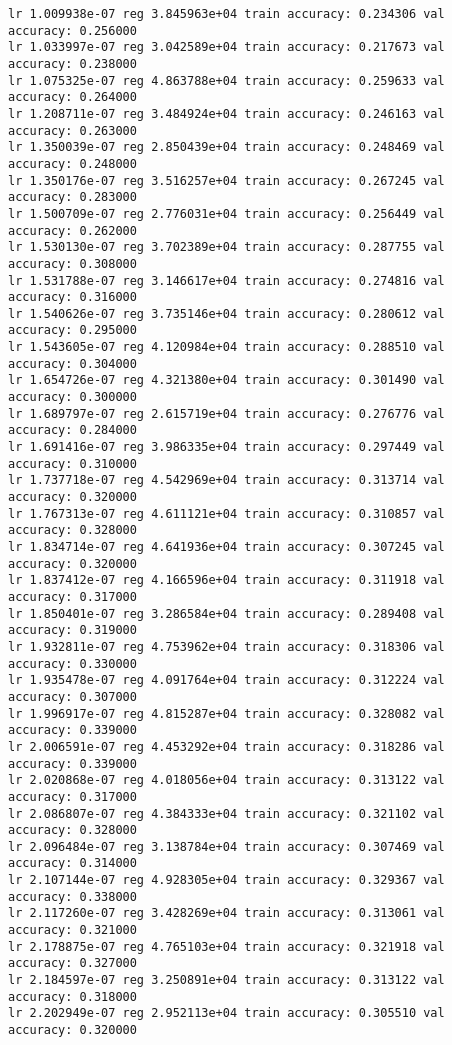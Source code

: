 \documentclass[11pt]{article}
\begin{document}
    \begin{Verbatim}[commandchars=\\\{\}]
lr 1.009938e-07 reg 3.845963e+04 train accuracy: 0.234306 val accuracy: 0.256000
lr 1.033997e-07 reg 3.042589e+04 train accuracy: 0.217673 val accuracy: 0.238000
lr 1.075325e-07 reg 4.863788e+04 train accuracy: 0.259633 val accuracy: 0.264000
lr 1.208711e-07 reg 3.484924e+04 train accuracy: 0.246163 val accuracy: 0.263000
lr 1.350039e-07 reg 2.850439e+04 train accuracy: 0.248469 val accuracy: 0.248000
lr 1.350176e-07 reg 3.516257e+04 train accuracy: 0.267245 val accuracy: 0.283000
lr 1.500709e-07 reg 2.776031e+04 train accuracy: 0.256449 val accuracy: 0.262000
lr 1.530130e-07 reg 3.702389e+04 train accuracy: 0.287755 val accuracy: 0.308000
lr 1.531788e-07 reg 3.146617e+04 train accuracy: 0.274816 val accuracy: 0.316000
lr 1.540626e-07 reg 3.735146e+04 train accuracy: 0.280612 val accuracy: 0.295000
lr 1.543605e-07 reg 4.120984e+04 train accuracy: 0.288510 val accuracy: 0.304000
lr 1.654726e-07 reg 4.321380e+04 train accuracy: 0.301490 val accuracy: 0.300000
lr 1.689797e-07 reg 2.615719e+04 train accuracy: 0.276776 val accuracy: 0.284000
lr 1.691416e-07 reg 3.986335e+04 train accuracy: 0.297449 val accuracy: 0.310000
lr 1.737718e-07 reg 4.542969e+04 train accuracy: 0.313714 val accuracy: 0.320000
lr 1.767313e-07 reg 4.611121e+04 train accuracy: 0.310857 val accuracy: 0.328000
lr 1.834714e-07 reg 4.641936e+04 train accuracy: 0.307245 val accuracy: 0.320000
lr 1.837412e-07 reg 4.166596e+04 train accuracy: 0.311918 val accuracy: 0.317000
lr 1.850401e-07 reg 3.286584e+04 train accuracy: 0.289408 val accuracy: 0.319000
lr 1.932811e-07 reg 4.753962e+04 train accuracy: 0.318306 val accuracy: 0.330000
lr 1.935478e-07 reg 4.091764e+04 train accuracy: 0.312224 val accuracy: 0.307000
lr 1.996917e-07 reg 4.815287e+04 train accuracy: 0.328082 val accuracy: 0.339000
lr 2.006591e-07 reg 4.453292e+04 train accuracy: 0.318286 val accuracy: 0.339000
lr 2.020868e-07 reg 4.018056e+04 train accuracy: 0.313122 val accuracy: 0.317000
lr 2.086807e-07 reg 4.384333e+04 train accuracy: 0.321102 val accuracy: 0.328000
lr 2.096484e-07 reg 3.138784e+04 train accuracy: 0.307469 val accuracy: 0.314000
lr 2.107144e-07 reg 4.928305e+04 train accuracy: 0.329367 val accuracy: 0.338000
lr 2.117260e-07 reg 3.428269e+04 train accuracy: 0.313061 val accuracy: 0.321000
lr 2.178875e-07 reg 4.765103e+04 train accuracy: 0.321918 val accuracy: 0.327000
lr 2.184597e-07 reg 3.250891e+04 train accuracy: 0.313122 val accuracy: 0.318000
lr 2.202949e-07 reg 2.952113e+04 train accuracy: 0.305510 val accuracy: 0.320000

\end{Verbatim}
\end{document}
